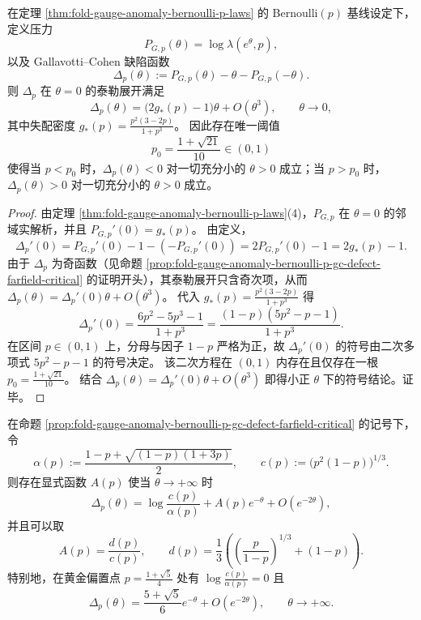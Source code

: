 \begin{theorem}\label{thm:fold-gauge-anomaly-gc-defect-linear-response-threshold}
在定理 \ref{thm:fold-gauge-anomaly-bernoulli-p-laws} 的 Bernoulli\((p)\) 基线设定下，定义压力
\[
P_{G,p}(\theta)=\log\lambda(e^\theta,p),
\]
以及 Gallavotti--Cohen 缺陷函数
\[
\Delta_p(\theta):=P_{G,p}(\theta)-\theta-P_{G,p}(-\theta).
\]
则 \(\Delta_p\) 在 \(\theta=0\) 的泰勒展开满足
\[
\Delta_p(\theta)=\bigl(2g_\ast(p)-1\bigr)\theta+O(\theta^3),
\qquad \theta\to 0,
\]
其中失配密度 \(g_\ast(p)=\frac{p^2(3-2p)}{1+p^3}\)。
因此存在唯一阈值
\[
p_0=\frac{1+\sqrt{21}}{10}\in(0,1)
\]
使得当 \(p<p_0\) 时，\(\Delta_p(\theta)<0\) 对一切充分小的 \(\theta>0\) 成立；当 \(p>p_0\) 时，\(\Delta_p(\theta)>0\) 对一切充分小的 \(\theta>0\) 成立。
\end{theorem}

\begin{proof}
由定理 \ref{thm:fold-gauge-anomaly-bernoulli-p-laws}(4)，\(P_{G,p}\) 在 \(\theta=0\) 的邻域实解析，并且
\(
P_{G,p}'(0)=g_\ast(p)
\)。
由定义，
\[
\Delta_p'(0)=P_{G,p}'(0)-1-(-P_{G,p}'(0))=2P_{G,p}'(0)-1=2g_\ast(p)-1.
\]
由于 \(\Delta_p\) 为奇函数（见命题 \ref{prop:fold-gauge-anomaly-bernoulli-p-gc-defect-farfield-critical} 的证明开头），其泰勒展开只含奇次项，从而
\(
\Delta_p(\theta)=\Delta_p'(0)\theta+O(\theta^3)
\)。
代入 \(g_\ast(p)=\frac{p^2(3-2p)}{1+p^3}\) 得
\[
\Delta_p'(0)=\frac{6p^2-5p^3-1}{1+p^3}
=\frac{(1-p)(5p^2-p-1)}{1+p^3}.
\]
在区间 \(p\in(0,1)\) 上，分母与因子 \(1-p\) 严格为正，故 \(\Delta_p'(0)\) 的符号由二次多项式 \(5p^2-p-1\) 的符号决定。
该二次方程在 \((0,1)\) 内存在且仅存在一根
\(
p_0=\frac{1+\sqrt{21}}{10}
\)。
结合 \(\Delta_p(\theta)=\Delta_p'(0)\theta+O(\theta^3)\) 即得小正 \(\theta\) 下的符号结论。证毕。
\end{proof}

\begin{proposition}[高场一阶指数渐近与黄金点闭式系数]\label{prop:fold-gauge-anomaly-gc-defect-farfield-expansion}
在命题 \ref{prop:fold-gauge-anomaly-bernoulli-p-gc-defect-farfield-critical} 的记号下，令
\[
\alpha(p):=\frac{1-p+\sqrt{(1-p)(1+3p)}}{2},
\qquad
c(p):=\bigl(p^2(1-p)\bigr)^{1/3}.
\]
则存在显式函数 \(A(p)\) 使当 \(\theta\to+\infty\) 时
\[
\Delta_p(\theta)=\log\frac{c(p)}{\alpha(p)}+A(p)e^{-\theta}+O(e^{-2\theta}),
\]
并且可以取
\[
A(p)=\frac{d(p)}{c(p)},
\qquad
d(p)=\frac13\left(\left(\frac{p}{1-p}\right)^{1/3}+(1-p)\right).
\]
特别地，在黄金偏置点 \(p=\frac{1+\sqrt5}{4}\) 处有 \(\log\frac{c(p)}{\alpha(p)}=0\) 且
\[
\Delta_{p}(\theta)=\frac{5+\sqrt5}{6}e^{-\theta}+O(e^{-2\theta}),
\qquad \theta\to+\infty.
\]
\end{proposition}

